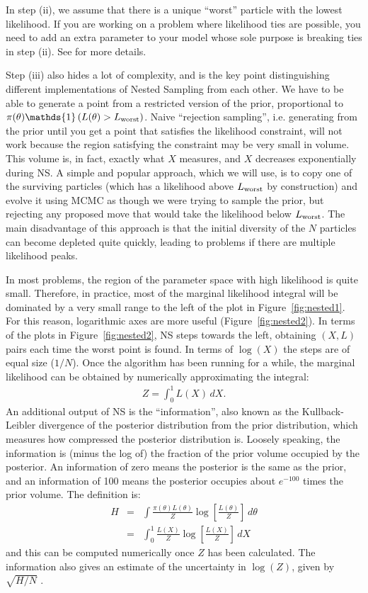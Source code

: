 In step (ii), we assume that there is a unique ``worst'' particle with the
lowest likelihood. If you are working on a problem where likelihood ties are
possible, you need to add an extra parameter to your model whose sole purpose
is breaking ties in step (ii). See \citet{murray} for more details.

Step (iii) also hides a lot of complexity, and is the
key point distinguishing different implementations of Nested Sampling from
each other. We have to be able to generate a point from a restricted version
of the prior, proportional to
$\pi(\theta)\mathds{1}\left(L(\theta) > L_{\rm worst}\right)$. Naive ``rejection
sampling'', i.e. generating from the prior until you get a point that
satisfies the likelihood constraint, will not work because the region satisfying
the constraint may be very small in volume. This volume is, in fact,
exactly what $X$ measures, and $X$ decreases exponentially during NS.
A simple and popular approach, which we will
use, is to copy one of the surviving particles (which has a likelihood above
$L_{\rm worst}$ by construction) and evolve it using MCMC as though we were
trying to sample the prior, but rejecting any proposed move that would take
the likelihood below $L_{\rm worst}$. The main disadvantage of this approach
is that the initial diversity of the $N$ particles can become depleted
quite quickly, leading to problems if there are multiple likelihood peaks.

In most problems, the region of the parameter space with high likelihood is
quite small. Therefore, in practice, most of the marginal likelihood integral
will be dominated by a very small range to the left of the plot in
Figure~\ref{fig:nested1}. For this reason, logarithmic axes are more useful
(Figure~\ref{fig:nested2}). In terms of the plots in Figure~\ref{fig:nested2},
NS steps towards the left, obtaining $(X, L)$ pairs each time the worst point
is found. In terms of $\log(X)$ the steps are of equal size ($1/N$). Once
the algorithm has been running for a while, the marginal likelihood can be
obtained by numerically approximating the integral:
\begin{eqnarray}
Z = \int_0^1 L(X) \, dX.
\end{eqnarray}
An additional output of NS is the ``information'', also known as the
Kullback-Leibler divergence of the posterior distribution from the prior
distribution, which measures how compressed the posterior distribution is.
Loosely speaking, the information is (minus the log of) the fraction of the
prior volume occupied by the posterior. An information of zero means the
posterior is the same as the prior, and an information of 100 means the
posterior occupies about $e^{-100}$ times the prior volume.
The definition is:
\begin{eqnarray}
H &=& \int \frac{\pi(\theta)L(\theta)}{Z}\log\left[\frac{L(\theta)}{Z}\right] \, d\theta\\
&=& \int_0^1 \frac{L(X)}{Z} \log\left[\frac{L(X)}{Z}\right] \, dX
\end{eqnarray}
and this can be computed numerically once $Z$ has been calculated.
The information also gives an estimate of the uncertainty in
$\log(Z)$, given by $\sqrt{H/N}$ \citep{skilling}.

